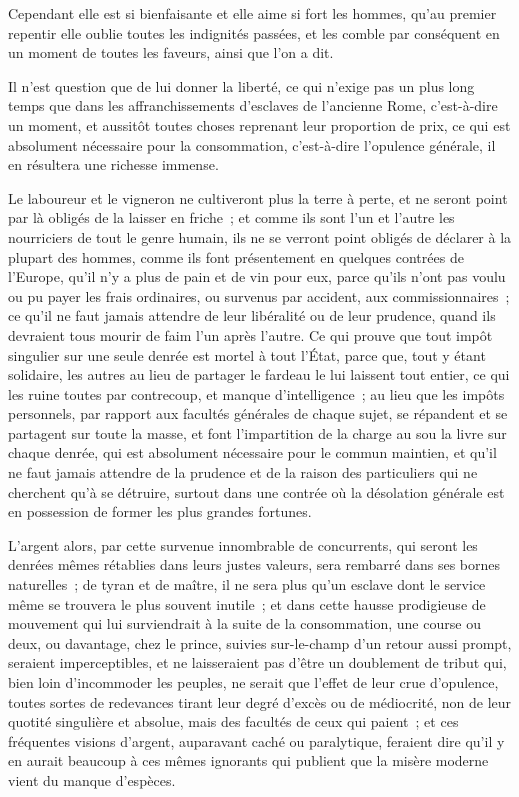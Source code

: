 \documentclass[french,twoside]{book} %
\begin{document}
Cependant elle est si bienfaisante et elle aime si fort les hommes, qu’au premier repentir elle oublie toutes les indignités passées, et les comble par conséquent en un moment de toutes les faveurs, ainsi que l’on a dit.\par
Il n’est question que de lui donner la liberté, ce qui n’exige pas un plus long temps que dans les affranchissements d’esclaves de l’ancienne Rome, c’est-à-dire un moment, et aussitôt toutes choses reprenant leur proportion de prix, ce qui est absolument nécessaire pour la consommation, c’est-à-dire l’opulence générale, il en résultera une richesse immense.\par
Le laboureur et le vigneron ne cultiveront plus la terre à perte, et ne seront point par là obligés de la laisser en friche ; et comme ils sont l’un et l’autre les nourriciers de tout le genre humain, ils ne se verront point obligés de déclarer à la plupart des hommes, comme ils font présentement en quelques contrées de l’Europe, qu’il n’y a plus de pain et de vin pour eux, parce qu’ils n’ont pas voulu ou pu payer les frais ordinaires, ou survenus par accident, aux commissionnaires ; ce qu’il ne faut jamais attendre de leur libéralité ou de leur prudence, quand ils devraient tous mourir de faim l’un après l’autre. Ce qui prouve que tout impôt singulier sur une seule denrée est mortel à tout l’État, parce que, tout y étant solidaire, les autres au lieu de partager le fardeau le lui laissent tout entier, ce qui les ruine toutes par contrecoup, et manque d’intelligence ; au lieu que les impôts personnels, par rapport aux facultés générales de chaque sujet, se répandent et se partagent sur toute la masse, et font l’impartition de la charge au sou la livre sur chaque denrée, qui est absolument nécessaire pour le commun maintien, et qu’il ne faut jamais attendre de la prudence et de la raison des particuliers qui ne cherchent qu’à se détruire, surtout dans une contrée où la désolation générale est en possession de former les plus grandes fortunes.\par
L’argent alors, par cette survenue innombrable de concurrents, qui seront les denrées mêmes rétablies dans leurs justes valeurs, sera rembarré dans ses bornes naturelles ; de tyran et de maître, il ne sera plus qu’un esclave dont le service même se trouvera le plus souvent inutile ; et dans cette hausse prodigieuse de mouvement qui lui surviendrait à la suite de la consommation, une course ou deux, ou davantage, chez le prince, suivies sur-le-champ d’un retour aussi prompt, seraient imperceptibles, et ne laisseraient pas d’être un doublement de tribut qui, bien loin d’incommoder les peuples, ne serait que l’effet de leur crue d’opulence, toutes sortes de redevances tirant leur degré d’excès ou de médiocrité, non de leur quotité singulière et absolue, mais des facultés de ceux qui paient ; et ces fréquentes visions d’argent, auparavant caché ou paralytique, feraient dire qu’il y en aurait beaucoup à ces mêmes ignorants qui publient que la misère moderne vient du manque d’espèces.\par
\end{document}
